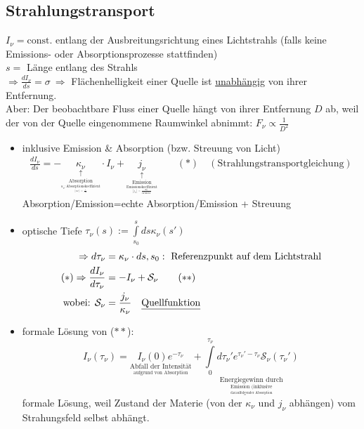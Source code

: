 \subsection{Strahlungstransport}
$I_\nu=\text{const.}$ entlang der Ausbreitungsrichtung eines Lichtstrahls (falls keine Emissions- oder Absorptionsprozesse stattfinden)\\
$s=$ Länge entlang des Strahls\\
$\Rightarrow \frac{dI_\nu}{ds}=\sigma \ \Rightarrow $ Flächenhelligkeit einer Quelle ist \underline{unabhängig} von ihrer Entfernung.\\
Aber: Der beobachtbare Fluss einer Quelle hängt von ihrer Entfernung $D$ ab, weil der von der Quelle eingenommene Raumwinkel abnimmt: $F_\nu \propto\frac{1}{D^2}$
\begin{itemize}[label={$\to$}]
\item inklusive Emission \& Absorption (bzw. Streuung von Licht)
\begin{align*}
\frac{dI_\nu}{ds}=-\underset{\underset{\underset{\underset{[\kappa_\nu]=\frac{1}{\si{\cm}}}{\kappa_\nu: \text{Absorptionskoeffizient}}}{\text{Absorption}}}{\uparrow}}{\kappa_\nu}\cdot I_\nu +\underset{\underset{\underset{\underset{[j_\nu]=\frac{\text{erg}}{\si{\cm^3\s\hertz}\ \text{ster}}}{\text{Emissionskoeffizient}}}{\text{Emission}}}{\uparrow}}{j_\nu} \qquad (\ast)\quad (\text{Strahlungstransportgleichung})
\end{align*}
Absorption/Emission=echte Absorption/Emission + Streuung
\item optische Tiefe $\tau_\nu(s):=\int\limits_{s_0}^s ds \kappa_\nu (s')$
\begin{align*}
\Rightarrow d\tau_\nu &=\kappa_\nu\cdot ds, s_0: \text{ Referenzpunkt auf dem Lichtstrahl}\\
(\ast)\Rightarrow \frac{dI_\nu}{d\tau_\nu}&=-I_\nu +\mathcal{S}_\nu\qquad (\ast\ast)\\
\text{wobei: } \mathcal{S}_\nu&=\frac{j_\nu}{\kappa_\nu} \quad \text{\underline{Quellfunktion}}
\end{align*}
\item formale Lösung von ($\ast\ast$):
\begin{equation*}
I_\nu(\tau_\nu)=\underset{\underset{\text{aufgrund von Absorption}}{\text{Abfall der Intensität}}}{I_\nu(0)e^{-\tau_\nu}}+\underset{\underset{\underset{\text{darauffolgender Absorption}}{\text{Emission (inklusive}}}{\text{Energiegewinn durch}}}{\int\limits_0^{\tau_\nu}d\tau_\nu'e^{\tau_\nu'-\tau_\nu}\mathcal{S}_\nu(\tau_\nu')}
\end{equation*}
formale Lösung, weil Zustand der Materie (von der $\kappa_\nu$ und $j_\nu$ abhängen) vom Strahungsfeld selbst abhängt.
\end{itemize}
